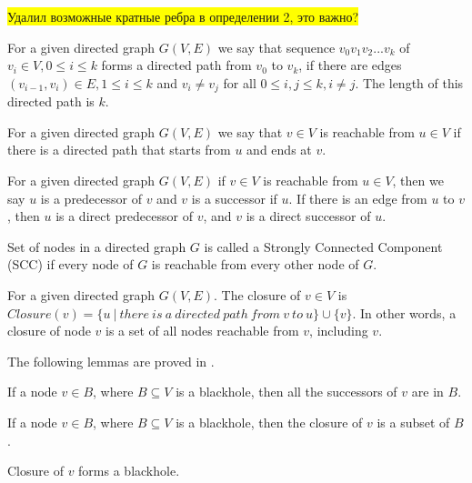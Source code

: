 \documentclass{svproc}
\newcommand{\FIXME}[1]{ %
	\colorbox{yellow}{#1}
}
\newcommand{\FIXME}[1]{ %
}
\begin{document}
\FIXME{Удалил возможные кратные ребра в определении 2, это важно?}
\begin{definition}
For a given directed graph $G(V,E)$ we say that sequence $v_0v_1v_2...v_{k}$ of $v_i \in V, 0 \leq i \leq k$ forms a directed path from $v_0$ to $v_k$, if there are edges $(v_{i-1}, v_i) \in E, 1 \leq i \leq k$ and $v_i \neq v_j$ for all $0 \leq i, j \leq k, i \neq j$. The length of this directed path is $k$.
\end{definition}

\begin{definition}
For a given directed graph $G(V,E)$ we say that $v \in V$ is reachable from $u \in V$ if there is a directed path that starts from $u$ and ends at $v$.
\end{definition}

\begin{definition}
For a given directed graph $G(V,E)$ if $v \in V$ is reachable from $u \in V$, then we say $u$ is a predecessor of $v$ and $v$ is a successor if $u$.
If there is an edge from $u$ to $v$, then $u$ is a direct predecessor of $v$, and $v$ is a direct successor of $u$.
\end{definition}

\begin{definition}
Set of nodes in a directed graph $G$ is called a Strongly Connected Component (SCC) if every node of $G$ is reachable from every other node of $G$.
\end{definition}

\begin{definition}
For a given directed graph $G(V,E)$. The closure of $v \in V$ is $Closure(v) = \{u\ |\ there\ is\ a\ directed\ path\ from\ v\ to\ u\} \cup \{v\}$.
In other words, a closure of node $v$ is a set of all nodes reachable from $v$, including $v$.
\end{definition}

The following lemmas are proved in \cite{li2010detecting}.

\begin{lemma}
If a node $v \in B$, where $B \subseteq V$ is a blackhole, then all the successors of $v$ are in $B$.
\end{lemma}

\begin{lemma}
If a node $v \in B$, where $B \subseteq V$ is a blackhole, then the closure of $v$ is a subset of $B$.
\end{lemma}

\begin{lemma}
Closure of $v$ forms a blackhole.
\end{lemma}
\end{document}
